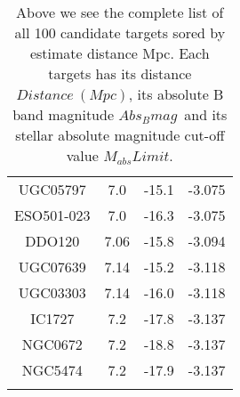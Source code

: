 \begin{longtable}{||c|ccc||}
		UGC05797 & 7.0 & -15.1 & -3.075 \\ ESO501-023 & 7.0 & -16.3 & -3.075 \\
		DDO120 & 7.06 & -15.8 & -3.094 \\ UGC07639 & 7.14 & -15.2 & -3.118 \\
		UGC03303 & 7.14 & -16.0 & -3.118 \\ IC1727 & 7.2 & -17.8 & -3.137 \\
		NGC0672 & 7.2 & -18.8 & -3.137 \\ NGC5474 & 7.2 & -17.9 & -3.137 \\
		\hline
		\caption{
			Above we see the complete list of all 100 candidate targets sored by estimate distance Mpc.
			Each targets has its distance $Distance\ (Mpc)$, its absolute B band magnitude $Abs_{B}mag$\ and its stellar absolute magnitude cut-off value $M_{abs}Limit$. 
		}
		\label{tab:8}
	\end{longtable}
